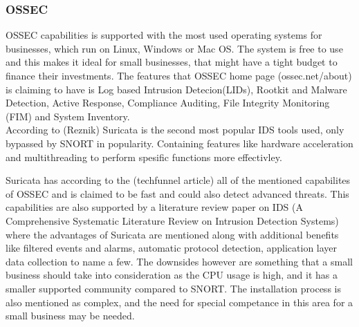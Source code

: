 
\subsubsection{OSSEC}

OSSEC capabilities is supported with the most used operating systems for businesses, which run on Linux, Windows or Mac OS. The system is free to use and this makes it ideal for small businesses, that might have a tight budget to finance their investments. The features that OSSEC home page (ossec.net/about) is claiming to have is Log based Intrusion Detecion(LIDs), Rootkit and Malware Detection, Active Response, Compliance Auditing, File Integrity Monitoring (FIM) and System Inventory.\\

According to (Reznik) Suricata is the second most popular IDS tools used, only bypassed by SNORT in popularity. Containing features like hardware acceleration and multithreading to perform spesific functions more effectivley.

Suricata has according to the (techfunnel article) all of the mentioned capabilites of OSSEC and is claimed to be fast and could also detect advanced threats. This capabilities are also supported by a literature review paper on IDS (A Comprehensive Systematic Literature Review on Intrusion Detection Systems) where the advantages of Suricata are mentioned along with additional benefits like filtered events and alarms, automatic protocol detection, application layer data collection to name a few. The downsides however are something that a small business should take into consideration as the CPU usage is high, and it has a smaller supported community compared to SNORT. The installation process is also mentioned as complex, and the need for special competance in this area for a small business may be needed.\\